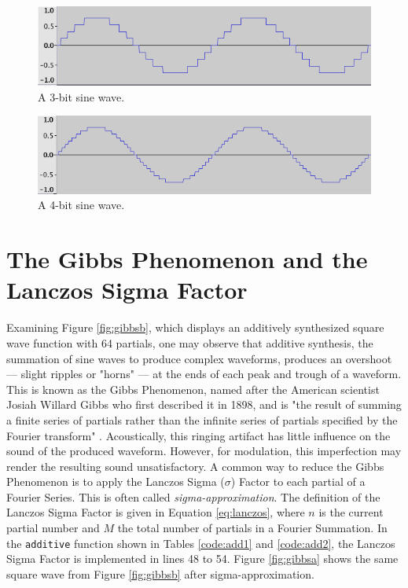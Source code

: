   \begin{figure}[th!]
    \includegraphics[scale=0.5]{img/sine3}
    \caption{A 3-bit sine wave.}
    \label{fig:sine3}
  \end{figure}

  \begin{figure}[th!]
    \includegraphics[scale=0.5]{img/sine4}
    \caption{A 4-bit sine wave.}
    \label{fig:sine4}
  \end{figure}

  \pagebreak

  \section{The Gibbs Phenomenon and the Lanczos Sigma Factor}

  Examining Figure \ref{fig:gibbsb}, which displays an additively synthesized square wave function with 64 partials, one may observe that additive synthesis, the summation of sine waves to produce complex waveforms, produces an overshoot --- slight ripples or "horns" --- at the ends of each peak and trough of a waveform. This is known as the Gibbs Phenomenon, named after the American scientist Josiah Willard Gibbs who first described it in 1898, and is "the result of summing a finite series of partials rather than the infinite series of partials specified by the Fourier transform" . Acoustically, this ringing artifact has little influence on the sound of the produced waveform. However, for modulation, this imperfection may render the resulting sound unsatisfactory. A common way to reduce the Gibbs Phenomenon is to apply the Lanczos Sigma ($\sigma$) Factor to each partial of a Fourier Series. This is often called \emph{sigma-approximation}. The definition of the Lanczos Sigma Factor is given in Equation \ref{eq:lanczos}, where $n$ is the current partial number and $M$ the total number of partials in a Fourier Summation. In the \texttt{additive} function shown in Tables \ref{code:add1} and \ref{code:add2}, the Lanczos Sigma Factor is implemented in lines 48 to 54. Figure \ref{fig:gibbsa} shows the same square wave from Figure \ref{fig:gibbsb} after sigma-approximation.

